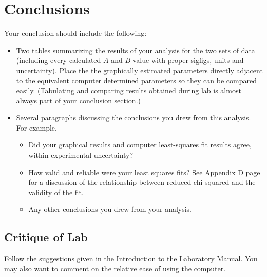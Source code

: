 \section*{Conclusions}
Your conclusion should include the following:
\begin{itemize}
\item Two tables summarizing the results of your analysis for the
two sets of data (including every calculated $A$ and $B$ value
with proper sigfigs, units and uncertainty).  Place the  the graphically estimated
parameters directly adjacent to the equivalent computer determined parameters so they can
be compared easily.
(Tabulating and comparing results obtained during lab is almost
always part of your conclusion section.)
%
\item Several paragraphs discussing the conclusions you drew from
this analysis.  For example,
\begin{itemize}
\item Did your graphical results and computer least-squares fit results agree, within
      experimental uncertainty?
%
\item How valid and reliable were your least squares fits?  See Appendix D page
\pageref{par:chi_square}
for a discussion of the relationship between reduced
chi-squared and the validity of the fit.
%
\item Any other conclusions you drew from your analysis.
\end{itemize}
\end{itemize}


\subsection*{Critique of Lab}
     Follow the suggestions given in the Introduction to the Laboratory Manual.
You may also want to comment on the relative ease of using the
computer.
